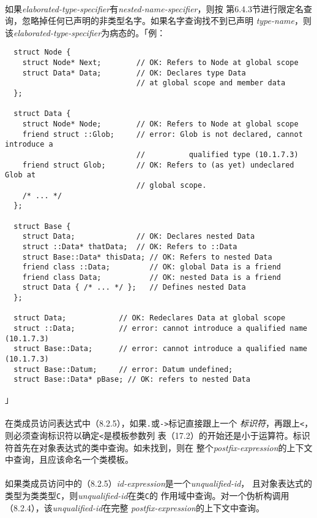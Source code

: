 \paragraph{}
如果\textit{elaborated-type-specifier}有\textit{nested-name-specifier}，则按
第6.4.3节进行限定名查询，忽略掉任何已声明的非类型名字。如果名字查询找不到已声明
\textit{type-name}，则该\textit{elaborated-type-specifier}为病态的。「例：
\begin{lstlisting}
  struct Node {
    struct Node* Next;        // OK: Refers to Node at global scope
    struct Data* Data;        // OK: Declares type Data
                              // at global scope and member data
  };

  struct Data {
    struct Node* Node;        // OK: Refers to Node at global scope
    friend struct ::Glob;     // error: Glob is not declared, cannot introduce a
                              //          qualified type (10.1.7.3)
    friend struct Glob;       // OK: Refers to (as yet) undeclared Glob at
                              // global scope.
    /* ... */
  };

  struct Base {
    struct Data;              // OK: Declares nested Data
    struct ::Data* thatData;  // OK: Refers to ::Data
    struct Base::Data* thisData; // OK: Refers to nested Data
    friend class ::Data;         // OK: global Data is a friend
    friend class Data;           // OK: nested Data is a friend
    struct Data { /* ... */ };   // Defines nested Data
  };

  struct Data;            // OK: Redeclares Data at global scope
  struct ::Data;          // error: cannot introduce a qualified name (10.1.7.3)
  struct Base::Data;      // error: cannot introduce a qualified name (10.1.7.3)
  struct Base::Datum;     // error: Datum undefined;
  struct Base::Data* pBase; // OK: refers to nested Data
\end{lstlisting}」

\paragraph{}
在类成员访问表达式中（8.2.5），如果\texttt{.}或\texttt{->}标记直接跟上一个
\textit{标识符}，再跟上\texttt{<}，则必须查询标识符以确定\texttt{<}是模板参数列
表（17.2）的开始还是小于运算符。标识符首先在对象表达式的类中查询。如未找到，则在
整个\textit{postfix-expression}的上下文中查询，且应该命名一个类模板。

\paragraph{}
如果类成员访问中的（8.2.5）\textit{id-expression}是一个\textit{unqualified-id}，
且对象表达式的类型为类类型\texttt{C}，则\textit{unqualified-id}在类\texttt{C}的
作用域中查询。对一个伪析构调用（8.2.4），该\textit{unqualified-id}在完整
\textit{postfix-expression}的上下文中查询。


